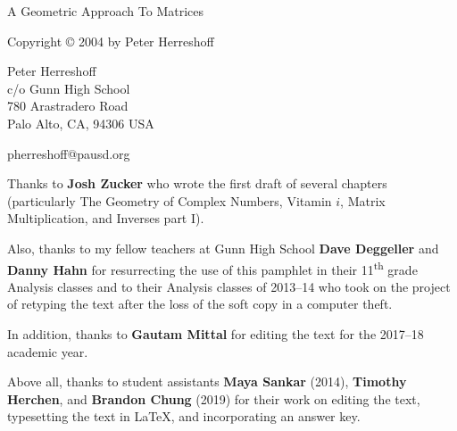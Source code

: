 \documentclass[../gatm.tex]{subfiles}
\begin{document}
\newcommand\dnew{\vspace{1cm}}

\begin{center}
	\vspace*{\fill}

	\doublespacing
	A Geometric Approach To Matrices

	Copyright \copyright{} 2004 by Peter Herreshoff  %

	\vspace{1cm}

	Peter Herreshoff\\
	c/o Gunn High School\\
	780 Arastradero Road\\
	Palo Alto, CA, 94306 USA

	\vspace{.5cm}

	pherreshoff@pausd.org

	\vspace{1cm}
\end{center}

\noindent Thanks to \textbf{Josh Zucker} who wrote the first draft of several chapters (particularly The Geometry of Complex Numbers, Vitamin $i$, Matrix Multiplication, and Inverses part I).

Also, thanks to my fellow teachers at Gunn High School \textbf{Dave Deggeller} and \textbf{Danny Hahn} for resurrecting the use of this pamphlet in their 11\textsuperscript{th} grade Analysis classes and to their Analysis classes of 2013--14 who took on the project of retyping the text after the loss of the soft copy in a computer theft.

In addition, thanks to \textbf{Gautam Mittal} for editing the text for the 2017--18 academic year.

Above all, thanks to student assistants \textbf{Maya Sankar} (2014), \textbf{Timothy Herchen}, and \textbf{\tiny Brandon Chung} (2019) for their work on editing the text, typesetting the text in \LaTeX{}, and incorporating an answer key.

\vspace*{\fill}
\end{document}
